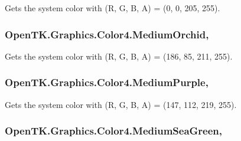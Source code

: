 Gets the system color with (R, G, B, A) = (0, 0, 205, 255). 

\hypertarget{struct_open_t_k_1_1_graphics_1_1_color4_abd2e52c22e3b9a0261a6174daebad7c1}{
\subsubsection[{Medium\-Orchid}]{ Open\-T\-K.\-Graphics.\-Color4.\-Medium\-Orchid\hspace{0.3cm}{\ttfamily [static]}, {\ttfamily [get]}}}\label{struct_open_t_k_1_1_graphics_1_1_color4_abd2e52c22e3b9a0261a6174daebad7c1}


Gets the system color with (R, G, B, A) = (186, 85, 211, 255). 

\hypertarget{struct_open_t_k_1_1_graphics_1_1_color4_a148f0ba059a13682505742c46276b32e}{
\subsubsection[{Medium\-Purple}]{ Open\-T\-K.\-Graphics.\-Color4.\-Medium\-Purple\hspace{0.3cm}{\ttfamily [static]}, {\ttfamily [get]}}}\label{struct_open_t_k_1_1_graphics_1_1_color4_a148f0ba059a13682505742c46276b32e}


Gets the system color with (R, G, B, A) = (147, 112, 219, 255). 

\hypertarget{struct_open_t_k_1_1_graphics_1_1_color4_af65f53c816790bf1b9b53b4145239b1c}{
\subsubsection[{Medium\-Sea\-Green}]{ Open\-T\-K.\-Graphics.\-Color4.\-Medium\-Sea\-Green\hspace{0.3cm}{\ttfamily [static]}, {\ttfamily [get]}}}\label{struct_open_t_k_1_1_graphics_1_1_color4_af65f53c816790bf1b9b53b4145239b1c}


